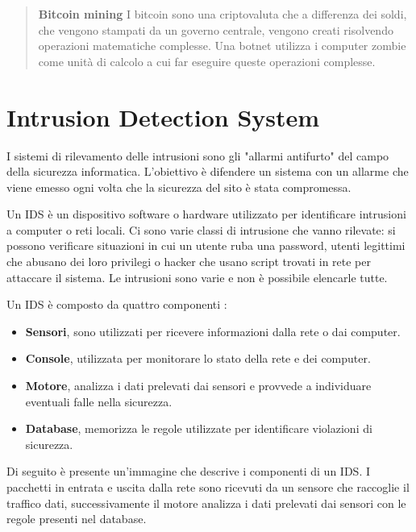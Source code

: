 \documentclass[../main.tex]{subfiles}
\begin{document}
\begin{verse}
				\textbf{Bitcoin mining} I bitcoin sono una criptovaluta che a differenza dei soldi, che vengono stampati da un governo centrale, vengono creati risolvendo operazioni matematiche complesse. Una botnet utilizza i computer zombie come unità di calcolo a cui far eseguire queste operazioni complesse.
\end{verse}

\section{Intrusion Detection System}
I sistemi di rilevamento delle intrusioni sono gli "allarmi antifurto" del campo della sicurezza informatica. L'obiettivo è difendere un sistema con un allarme che viene emesso ogni volta che la sicurezza del sito è stata compromessa. \cite{IDS} \newline

Un IDS è un dispositivo software o hardware utilizzato per identificare intrusioni a computer o reti locali.
Ci sono varie classi di intrusione che vanno rilevate: si possono verificare situazioni in cui un utente ruba una password, utenti legittimi che abusano dei loro privilegi o hacker che usano script trovati in rete per attaccare il sistema. Le intrusioni sono varie e non è possibile elencarle tutte.

Un IDS è composto da quattro componenti \cite{idsbook}:

\begin{itemize}
				\item \textbf{Sensori}, sono utilizzati per ricevere informazioni dalla rete o dai computer.

				\item \textbf{Console}, utilizzata per monitorare lo stato della rete e dei computer.

				\item \textbf{Motore}, analizza i dati prelevati dai sensori e provvede a individuare eventuali falle nella sicurezza.

				\item \textbf{Database}, memorizza le regole utilizzate per identificare violazioni di sicurezza.
\end{itemize}

Di seguito è presente un'immagine che descrive i componenti di un IDS. I pacchetti in entrata e uscita dalla rete sono ricevuti da un sensore che raccoglie il traffico dati, successivamente il motore analizza i dati prelevati dai sensori con le regole presenti nel database.
\end{document}
